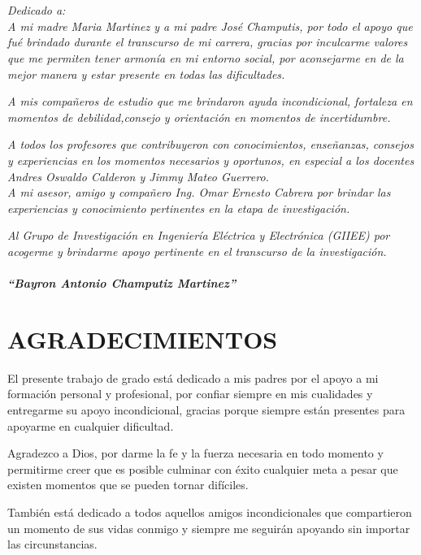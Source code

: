 
\chapter*{}
\begin{flushright}
\textit{Dedicado a: \\
A mi madre Maria Martinez y a mi padre José Champutis,
por todo el apoyo que fué brindado durante el transcurso de mi carrera,
gracias por inculcarme valores que me permiten tener armonía en mi entorno social, 
por aconsejarme en de la mejor manera y estar presente en todas las dificultades.}

\textit{A mis compañeros de estudio que me brindaron ayuda incondicional,
fortaleza en momentos de debilidad,consejo y orientación en momentos de incertidumbre.}

\textit{A todos los profesores que contribuyeron con conocimientos, enseñanzas,
 consejos y experiencias en los momentos necesarios y oportunos, en especial a los docentes Andres Oswaldo Calderon y Jimmy Mateo Guerrero.\\}
\textit{A mi asesor, amigo y compañero Ing. Omar Ernesto Cabrera por brindar las experiencias y conocimiento pertinentes en la etapa de investigación.}


\textit{Al Grupo de Investigación en Ingeniería Eléctrica y Electrónica (GIIEE) por acogerme y brindarme apoyo pertinente en el transcurso de la investigación.
\\
\textbf{\\``Bayron Antonio Champutiz Martinez''}}
\end{flushright}


\chapter*{AGRADECIMIENTOS} %

El presente trabajo de grado está dedicado a mis padres por el apoyo a mi formación personal y profesional, 
por confiar siempre en mis cualidades y entregarme su apoyo incondicional,
gracias porque siempre están presentes para apoyarme en cualquier dificultad.

Agradezco a Dios, por darme la fe y la fuerza necesaria en todo momento y permitirme creer que es posible culminar con éxito cualquier meta 
a pesar que existen momentos que se pueden tornar difíciles.


También está dedicado a todos aquellos amigos incondicionales que compartieron un momento de sus vidas conmigo y siempre me seguirán apoyando sin importar las circunstancias.